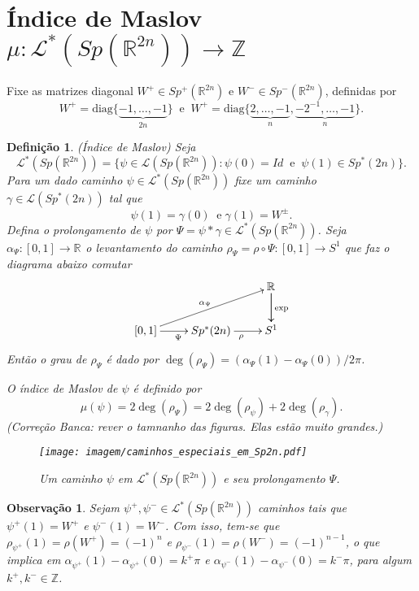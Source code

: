\documentclass[12pt]{book}
\newtheorem{definicao}[teorema]{Definição}
\newtheorem{observacao}[teorema]{Observação}
\newcommand{\caminhosespeciais}[1]{\mathcal{L}^{*}(#1)}
\newcommand{\caminhos}{\mathcal{L}}
\newcommand{\circulo}{S^{1}}
\newcommand{\diag}{\text{diag}}
\newcommand{\dominioMaslov}{\caminhos^{*}(\gruposimpletico{\real{2n}})}
\newcommand{\gruposimpletico}[1]{Sp(#1)}
\newcommand{\gruposimpleticonaodegenerado}[1]{Sp^{#1}(2n)}
\newcommand{\gruposimpleticomais}[1]{Sp^{+}(#1)}
\newcommand{\gruposimpleticomenos}[1]{Sp^{-}(#1)}
\newcommand{\inteiros}{\mathbb{Z}}
\newcommand{\intervalo}{[0,1]}
\newcommand{\real}[1]{\mathbb{R}^{#1}}
\newcommand{\reta}{\real{}}
\newcommand{\alerta}[1]{{\color{red}#1}}
\newcommand{\correcaobanca}[1]{\alerta{(Correção Banca: #1)}}
\begin{document}
	
	\section{Índice de Maslov $\mu : \dominioMaslov \to \inteiros$}\label{secao_indice_maslov}
	
	Fixe as matrizes diagonal $W^{+}\in \gruposimpleticomais{\real{2n}}$ e $W^{-}\in \gruposimpleticomenos{\real{2n}}$, definidas por
	$$
	W^{+}=\diag\{\underbrace{-1,\dots, -1}_{2n} \} \;\; \text{e}\;\;W^{+}=\diag\{\underbrace{2,\dots, -1}_{n},\underbrace{-2^{-1},\dots, -1}_{n} \} .
	$$
	
	\begin{definicao}
		(Índice de Maslov) 
		Seja 
		$$
		\dominioMaslov=\{ \psi \in \caminhos(\gruposimpletico{\real{2n}}): \psi(0)=Id \;\; \text{e}\;\; \psi(1)\in \gruposimpleticonaodegenerado{*}\}.
		$$
		Para um dado caminho $\psi \in \dominioMaslov$ fixe um caminho $\gamma \in \caminhos(\gruposimpleticonaodegenerado{*})$ tal que 
		$$
		\psi(1)=\gamma(0)\;\;\text{e}\;\gamma(1)=W^{\pm}.
		$$
		Defina o prolongamento de $\psi$ por $\Psi = \psi*\gamma \in   \dominioMaslov$. Seja $\alpha_{\Psi}: \intervalo \to \reta$ o levantamento do caminho $\rho_{\Psi} = \rho \circ \Psi:\intervalo\to \circulo$ que faz o diagrama abaixo comutar
		$$
		\xymatrix{
			& & \real{}\ar[d]\ar[d]^{\text{exp}}
			\\
			[0,1 ]\ar[urr]^{\alpha_{\Psi}} \ar[r]_{\Psi} & \gruposimpleticonaodegenerado{*} \ar[r]_{\rho} & S^{1}
		}
		$$	
		Então o grau de $\rho_{\Psi}$ é dado por $\deg(\rho_{\Psi}) = (\alpha_{\Psi}(1)-\alpha_{\Psi}(0))/2\pi$. 
		
		O índice de Maslov de $\psi$ é definido por
		$$
		\mu(\psi)= 2\deg(\rho_{\Psi}) = 2\deg(\rho_{\psi}) + 2\deg(\rho_{\gamma}).
		$$
		\correcaobanca{rever o tamnanho das figuras. Elas estão muito grandes.}
		\begin{figure}[!h]
			\centering
			\texttt{[image: imagem/caminhos\_especiais\_em\_Sp2n.pdf]}
			\caption{Um caminho $\psi$ em $\caminhosespeciais{\gruposimpletico{\real{2n}}}$ e seu prolongamento $\Psi$.}
		\end{figure}
	\end{definicao}
	
	\begin{observacao}
		Sejam $\psi^{+}, \psi^{-} \in  \caminhosespeciais{\gruposimpletico{\real{2n}}}$ caminhos tais que $\psi^{+}(1)=W^{+}$ e $\psi^{-}(1)=W^{-}$. Com isso, tem-se que $\rho_{\psi^{+}}(1) =\rho(W^{+}) = (-1)^{n}$ e $\rho_{\psi^{-}}(1) =\rho(W^{-}) = (-1)^{n-1}$, o que implica em $\alpha_{\psi^{+}}(1)-\alpha_{\psi^{+}}(0) = k^{+}\pi$ e $\alpha_{\psi^{-}}(1)-\alpha_{\psi^{-}}(0) = k^{-}\pi$, para algum $k^{+}, k^{-}\in \inteiros$.
	\end{observacao}
	
\end{document}
